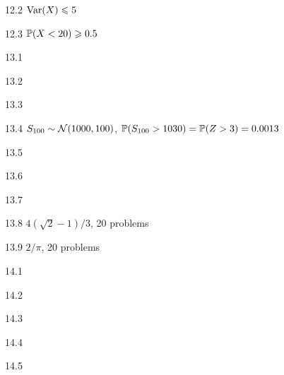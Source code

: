 \protect \hypertarget {soln:12.2}{}
\begin{solution}{{12.2}}
  $\Var(X)\leq 5$
\end{solution}
\protect \hypertarget {soln:12.3}{}
\begin{solution}{{12.3}}
  $\P(X<20) \geq 0.5$
\end{solution}
\protect \hypertarget {soln:13.1}{}
\begin{solution}{{13.1}}
\end{solution}
\protect \hypertarget {soln:13.2}{}
\begin{solution}{{13.2}}
\end{solution}
\protect \hypertarget {soln:13.3}{}
\begin{solution}{{13.3}}
\end{solution}
\protect \hypertarget {soln:13.4}{}
\begin{solution}{{13.4}}
  $S_{100} \sim \cN(1000, 100)$, $\P(S_{100}>1030)=\P(Z>3)=0.0013$
\end{solution}
\protect \hypertarget {soln:13.5}{}
\begin{solution}{{13.5}}
\end{solution}
\protect \hypertarget {soln:13.6}{}
\begin{solution}{{13.6}}
\end{solution}
\protect \hypertarget {soln:13.7}{}
\begin{solution}{{13.7}}
\end{solution}
\protect \hypertarget {soln:13.8}{}
\begin{solution}{{13.8}}
  $4(\sqrt{2}-1)/3$, 20 problems
\end{solution}
\protect \hypertarget {soln:13.9}{}
\begin{solution}{{13.9}}
  $2/\pi$, 20 problems
\end{solution}
\protect \hypertarget {soln:14.1}{}
\begin{solution}{{14.1}}
\end{solution}
\protect \hypertarget {soln:14.2}{}
\begin{solution}{{14.2}}
\end{solution}
\protect \hypertarget {soln:14.3}{}
\begin{solution}{{14.3}}
\end{solution}
\protect \hypertarget {soln:14.4}{}
\begin{solution}{{14.4}}
\end{solution}
\protect \hypertarget {soln:14.5}{}
\begin{solution}{{14.5}}
\end{solution}
